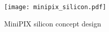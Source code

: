 \begin{figure}[h]
    \centering
    \texttt{[image: minipix\_silicon.pdf]}
    \caption{MiniPIX silicon concept design}
    \label{fig:minipix_silicon}
\end{figure}
%
%

